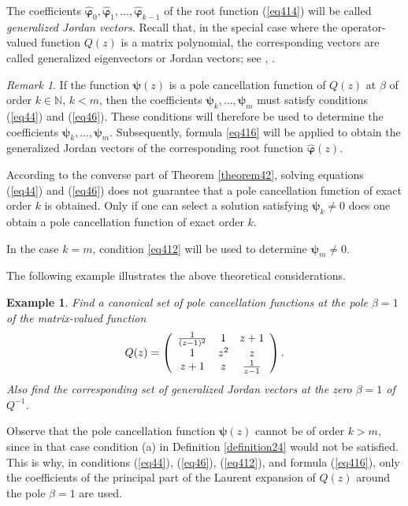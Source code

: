 \documentclass[11pt, reqno]{amsart}
\theoremstyle{plain}
\newtheorem{exm}{Example}[section]
\theoremstyle{remark}
\newtheorem{rem}{Remark}[section]
\newcounter{str}
\numberwithin{equation}{section}
\begin{document}
The coefficients $\boldsymbol{\hat{\varphi}}_{0}, \boldsymbol{\hat{\varphi}}_{1}, \ldots, \boldsymbol{\hat{\varphi}}_{k-1}$ of the root function (\ref{eq414}) will be called \textit{generalized Jordan vectors}. Recall that, in the special case where the operator-valued function $Q(z)$ is a matrix polynomial, the corresponding vectors are called generalized eigenvectors or Jordan vectors; see \cite[p. 24]{GLR}, \cite{B5}.

\begin{rem}\label{remark48}
If the function $\boldsymbol{\psi}(z)$ is a pole cancellation function of $Q(z)$ at $\beta$ of order $k \in \mathbb{N}$, $k < m$, then the coefficients $\boldsymbol{\psi}_{k}, \ldots, \boldsymbol{\psi}_{m}$ must satisfy conditions (\ref{eq44}) and (\ref{eq46}). These conditions will therefore be used to determine the coefficients $\boldsymbol{\psi}_{k}, \ldots, \boldsymbol{\psi}_{m}$. Subsequently, formula \eqref{eq416} will be applied to obtain the generalized Jordan vectors of the corresponding root function $\boldsymbol{\hat{\varphi}}(z)$.

According to the converse part of Theorem \ref{theorem42}, solving equations (\ref{eq44}) and (\ref{eq46}) does not guarantee that a pole cancellation function of exact order $k$ is obtained. Only if one can select a solution satisfying $\boldsymbol{\psi}_{k} \neq 0$ does one obtain a pole cancellation function of exact order $k$.

In the case $k = m$, condition \eqref{eq412} will be used to determine $\boldsymbol{\psi}_{m}\neq 0$.
\end{rem}

The following example illustrates the above theoretical considerations.
\begin{exm}
\label{example414}
Find a canonical set of pole cancellation functions at the pole $\beta = 1$ of the matrix-valued function
\[
Q(z)=\left( {\begin{array}{*{20}c}
\frac{1}{(z-1)^{2}} &  1 & z+1\\
1 &  z^{2} & z\\
z+1 &  z & \frac{1}{z-1}\\
\end{array} } \right).
\]
Also find the corresponding set of generalized Jordan vectors at the zero $\beta = 1$ of $Q^{-1}$.
\end{exm}

Observe that the pole cancellation function $\boldsymbol{\psi}(z)$ cannot be of order $k > m$, since in that case condition (a) in Definition \ref{definition24} would not be satisfied. This is why, in conditions (\ref{eq44}), (\ref{eq46}), (\ref{eq412}), and formula (\ref{eq416}), only the coefficients of the principal part of the Laurent expansion of $Q(z)$ around the pole $\beta = 1$ are used.
\end{document}
